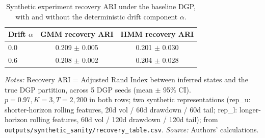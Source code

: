 \documentclass[preprint,12pt,authoryear]{elsarticle}
\begin{document}
\begin{table}[!htbp]
\centering
\small
\setlength{\tabcolsep}{4pt}
\caption{Synthetic experiment recovery ARI under the baseline DGP, with and without the deterministic drift component $\alpha$.}
\label{tab:synth_robustness}
\begin{tabular}{lcc}
\toprule
Drift $\alpha$ & GMM recovery ARI & HMM recovery ARI \\
\midrule
0.0 & 0.209 $\pm$ 0.005 & 0.201 $\pm$ 0.030 \\
0.6 & 0.208 $\pm$ 0.002 & 0.204 $\pm$ 0.028 \\
\bottomrule
\end{tabular}
\par\medskip
\footnotesize
\textit{Notes:} Recovery ARI = Adjusted Rand Index between inferred states and the true DGP partition, across 5 DGP seeds (mean $\pm$ 95\% CI). $p=0.97, K=3, T=2{,}200$ in both rows; two synthetic representations (rep\_u: shorter-horizon rolling features, 20d vol / 60d drawdown / 60d tail; rep\_l: longer-horizon rolling features, 60d vol / 120d drawdown / 120d tail); from \texttt{outputs/synthetic\_sanity/recovery\_table.csv}. \textit{Source:} Authors' calculations.
\end{table}
\end{document}
